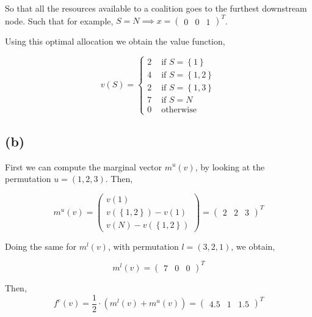 \documentclass[american]{scrartcl}
\newcommand{\set}[1]{\left\{#1\right\}}
\begin{document}
So that all the resources available to a coalition goes to the furthest downstream node. Such that for example, $S = N \implies x = \begin{pmatrix} 0 & 0 & 1 \end{pmatrix}^T$.

Using this optimal allocation we obtain the value function,

\begin{equation}
    v(S) = \begin{cases}
        2 & \text{ if } S = \set{1}    \\
        4 & \text{ if } S = \set{1, 2} \\
        2 & \text{ if } S = \set{1, 3} \\
        7 & \text{ if } S = N          \\
        0 & \text{ otherwise }
    \end{cases}
\end{equation}

\subsection*{(b)}

First we can compute the marginal vector $m^u(v)$, by looking at the permutation $u = (1, 2, 3)$. Then,

\begin{equation}
    m^u(v) = \begin{pmatrix}
        v(1)                 \\
        v(\set{1, 2}) - v(1) \\
        v(N) - v(\set{1, 2})
    \end{pmatrix} = \begin{pmatrix}
        2 &
        2 &
        3
    \end{pmatrix}^T
\end{equation}

Doing the same for $m^l(v)$, with permutation $l = (3, 2, 1)$, we obtain,

\begin{equation}
    m^l(v) =  \begin{pmatrix}
        7 &
        0 &
        0
    \end{pmatrix}^T
\end{equation}

Then, \begin{equation}
    f^e(v) = \frac{1}{2} \cdot (m^l(v) + m^u(v)) = \begin{pmatrix}
        4.5 & 1 & 1.5
    \end{pmatrix}^T
\end{equation}
\end{document}
